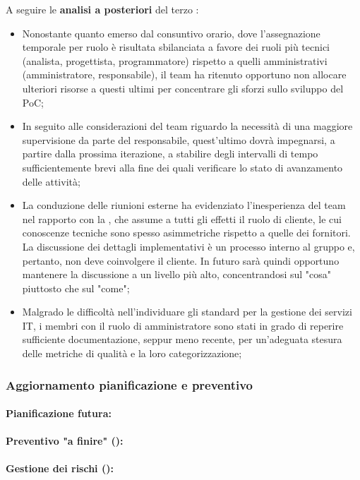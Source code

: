 \vspace{0.5\baselineskip}
\par A seguire le \textbf{analisi a posteriori} del terzo :
\begin{itemize}
  \item Nonostante quanto emerso dal consuntivo orario, dove l'assegnazione temporale per ruolo è risultata sbilanciata a favore dei ruoli più tecnici (analista, progettista, programmatore) rispetto a quelli amministrativi (amministratore, responsabile), il team ha ritenuto opportuno non allocare ulteriori risorse a questi ultimi per concentrare gli sforzi sullo sviluppo del PoC;
  \item In seguito alle considerazioni del team riguardo la necessità di una maggiore supervisione da parte del responsabile, quest'ultimo dovrà impegnarsi, a partire dalla prossima iterazione, a stabilire degli intervalli di tempo sufficientemente brevi alla fine dei quali verificare lo stato di avanzamento delle attività;
  \item La conduzione delle riunioni esterne ha evidenziato l'inesperienza del team nel rapporto con la , che assume a tutti gli effetti il ruolo di cliente, le cui conoscenze tecniche sono spesso asimmetriche rispetto a quelle dei fornitori. La discussione dei dettagli implementativi è un processo interno al gruppo e, pertanto, non deve coinvolgere il cliente. In futuro sarà quindi opportuno mantenere la discussione a un livello più alto, concentrandosi sul "cosa" piuttosto che sul "come";
  \item Malgrado le difficoltà nell'individuare gli standard per la gestione dei servizi IT, i membri con il ruolo di amministratore sono stati in grado di reperire sufficiente documentazione, seppur meno recente, per un'adeguata stesura delle metriche di qualità e la loro categorizzazione;
\end{itemize}

\subsubsection{Aggiornamento pianificazione e preventivo}

\paragraph*{Pianificazione futura:}

\paragraph*{Preventivo "a finire" ():}

\paragraph*{Gestione dei rischi ():}

